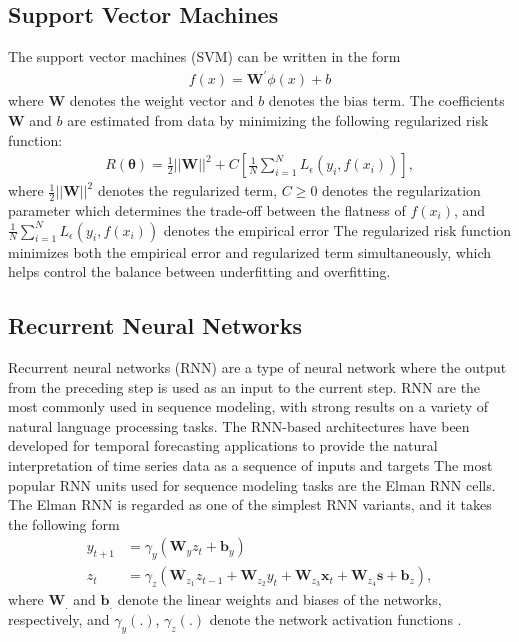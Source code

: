 \documentclass[twoside]{article}
\begin{document}
\subsection{Support Vector Machines}
The support vector machines (SVM) can be written in the form
\begin{align*}
    f(x) = \mathbf{W}^{\prime} \phi (x) + b
\end{align*}
where $\mathbf{W}$ denotes the weight vector and $b$ denotes the bias term. The coefficients $\mathbf{W}$ and $b$ are estimated from data by minimizing the following regularized risk function:
\begin{align*}
    R(\pmb{\theta}) = \frac{1}{2}||\mathbf{W}||^{2} + C \left[ \frac{1}{N} \sum_{i=1}^{N} L_{\epsilon} \left( y_{i}, f(x_{i}) \right) \right],
\end{align*}
where $\frac{1}{2}||\mathbf{W}||^{2}$ denotes the regularized term, $C \ge 0$ denotes the regularization parameter which determines the trade-off between the flatness of $f(x_{i})$, and $\frac{1}{N} \sum_{i=1}^{N} L_{\epsilon} \left( y_{i}, f(x_{i}) \right)$ denotes the empirical error \cite{Rathod : 2021} The regularized risk function minimizes both the empirical error and regularized term simultaneously, which helps control the balance between underfitting and overfitting.
\subsection{Recurrent Neural Networks}
Recurrent neural networks (RNN) are a type of neural network where the output from the preceding step is used as an input to the current step. RNN are the most commonly used in sequence modeling, with strong results on a variety of natural language processing tasks. The RNN-based architectures have been developed for temporal forecasting applications to provide the natural interpretation of time series data as a sequence of inputs and targets \cite{Lim : 2021} The most popular RNN units used for sequence modeling tasks are the Elman RNN cells. The Elman RNN is regarded as one of the simplest RNN variants, and it takes the following form
\begin{align*}
    y_{t+1} &= \gamma_{y} \left( \mathbf{W}_{y}z_{t} + \mathbf{b}_{y} \right)\\
    z_{t} &= \gamma_{z} \left( \mathbf{W}_{z_{1}}z_{t-1} + \mathbf{W}_{z_{2}}y_{t} + \mathbf{W}_{z_{3}}\mathbf{x}_{t} + \mathbf{W}_{z_{4}} \mathbf{s} + \mathbf{b}_{z} \right),
\end{align*}
where $\mathbf{W}_{.}$ and $\mathbf{b}_{.}$ denote the linear weights and biases of the networks, respectively, and $\gamma_{y}(.)$, $\gamma_{z}(.)$ denote the network activation functions \cite{Lim : 2021}.
\end{document}
